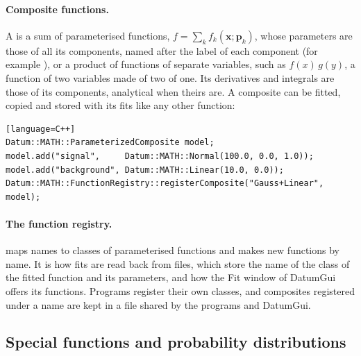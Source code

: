 \paragraph{Composite functions.}
A  is a sum of parameterised functions, $f = \sum_k f_k(\mathbf{x};\mathbf{p}_k)$, whose
parameters are those of all its components, named after the label of each component (for example
), or a product of functions of separate variables, such as $f(x)\,g(y)$, a function of two
variables made of two of one. Its derivatives and integrals are those of its components, analytical when theirs
are. A composite can be fitted, copied and stored with its fits like any other function:
\begin{widetext}
\begin{verbatim}[language=C++]
Datum::MATH::ParameterizedComposite model;
model.add("signal",     Datum::MATH::Normal(100.0, 0.0, 1.0));
model.add("background", Datum::MATH::Linear(10.0, 0.0));
Datum::MATH::FunctionRegistry::registerComposite("Gauss+Linear", model);
\end{verbatim}
\end{widetext}
\paragraph{The function registry.}
 maps names to classes of parameterised functions and makes new functions by name. It is how
fits are read back from files, which store the name of the class of the fitted function and its parameters, and
how the Fit window of DatumGui offers its functions. Programs register their own classes, and composites registered
under a name are kept in a file shared by the programs and DatumGui.

\subsection{Special functions and probability distributions}
\label{sec:distributions}

